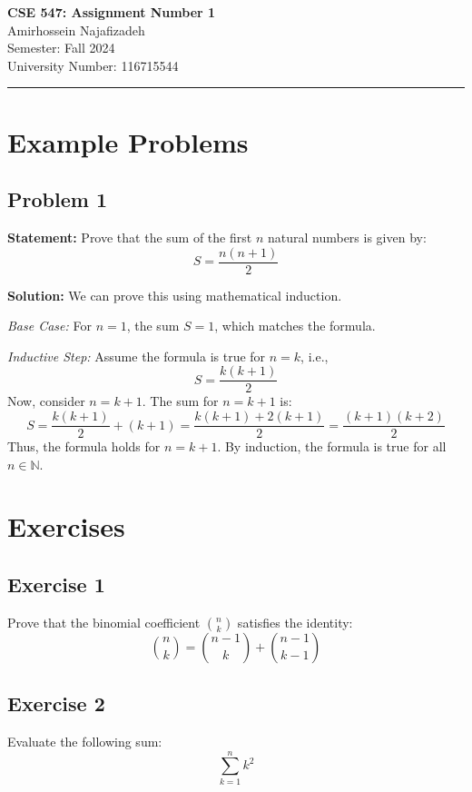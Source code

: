 \documentclass[12pt]{article}
\begin{document}
\begin{center}
    {\LARGE\textbf{CSE 547: Assignment Number 1}} \\[1em]
    {\large Amirhossein Najafizadeh} \\[1em]
    Semester: Fall 2024 \\ 
    University Number: 116715544 \\[1em]
    \noindent\rule{\textwidth}{0.6pt}
\end{center}

\section{Example Problems}
\subsection{Problem 1}
\textbf{Statement:} Prove that the sum of the first $n$ natural numbers is given by:
\[
S = \frac{n(n+1)}{2}
\]

\textbf{Solution:} We can prove this using mathematical induction.

\textit{Base Case:} For $n = 1$, the sum $S = 1$, which matches the formula.

\textit{Inductive Step:} Assume the formula is true for $n = k$, i.e.,
\[
S = \frac{k(k+1)}{2}
\]
Now, consider $n = k+1$. The sum for $n = k+1$ is:
\[
S = \frac{k(k+1)}{2} + (k+1) = \frac{k(k+1) + 2(k+1)}{2} = \frac{(k+1)(k+2)}{2}
\]
Thus, the formula holds for $n = k+1$. By induction, the formula is true for all $n \in \mathbb{N}$.

\section{Exercises}
\subsection{Exercise 1}
Prove that the binomial coefficient $\binom{n}{k}$ satisfies the identity:
\[
\binom{n}{k} = \binom{n-1}{k} + \binom{n-1}{k-1}
\]

\subsection{Exercise 2}
Evaluate the following sum:
\[
\sum_{k=1}^{n} k^2
\]
\end{document}

